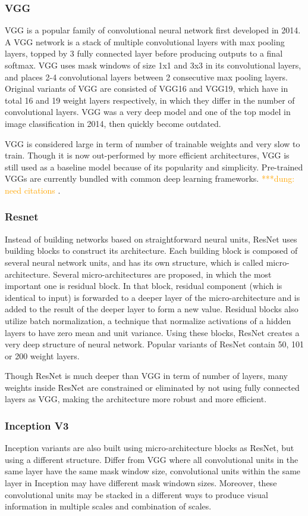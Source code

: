 \documentclass[conference]{IEEEtran}
\newcommand{\dungnote}[1]{ {\textcolor{orange} { ***dung: #1 }}}
\newcommand{\dungnote}[1]{}
\begin{document}
\subsubsection{VGG}
VGG is a popular family of convolutional neural network first developed in 2014. A VGG network is a stack of multiple convolutional layers with max pooling layers, topped by 3 fully connected layer before producing outputs to a final softmax. VGG uses mask windows of size 1x1 and 3x3 in its convolutional layers, and places 2-4 convolutional layers between 2 consecutive max pooling layers. Original variants of VGG are consisted of VGG16 and VGG19, which have in total 16 and 19 weight layers respectively, in which they differ in the number of convolutional layers. VGG was a very deep model and one of the top model in image classification in 2014, then quickly become outdated.

VGG is considered large in term of number of trainable weights and very slow to train. Though it is now out-performed by more efficient architectures, VGG is still used as a baseline model because of its popularity and simplicity. Pre-trained VGGs are currently bundled with common deep learning frameworks. \dungnote{need citations}.

\subsubsection{Resnet}
Instead of building networks based on straightforward neural units, ResNet uses building blocks to construct its architecture. Each building block is composed of several neural network units, and has its own structure, which is called micro-architecture. Several micro-architectures are proposed, in which the most important one is residual block. In that block, residual component (which is identical to input) is forwarded to a deeper layer of the micro-architecture and is added to the result of the deeper layer to form a new value. Residual blocks also utilize batch normalization, a technique that normalize activations of a hidden layers to have zero mean and unit variance. Using these blocks, ResNet creates a very deep structure of neural network. Popular variants of ResNet contain 50, 101 or 200 weight layers.

Though ResNet is much deeper than VGG in term of number of layers, many weights inside ResNet are constrained or eliminated by not using fully connected layers as VGG, making the architecture more robust and more efficient.

\subsubsection{Inception V3}
Inception variants are also built using micro-architecture blocks as ResNet, but using a different structure. Differ from VGG where all convolutional units in the same layer have the same mask window size, convolutional units within the same layer in Inception may have different mask windown sizes. Moreover, these convolutional units may be stacked in a different ways to produce visual information in multiple scales and combination of scales.  
\end{document}
